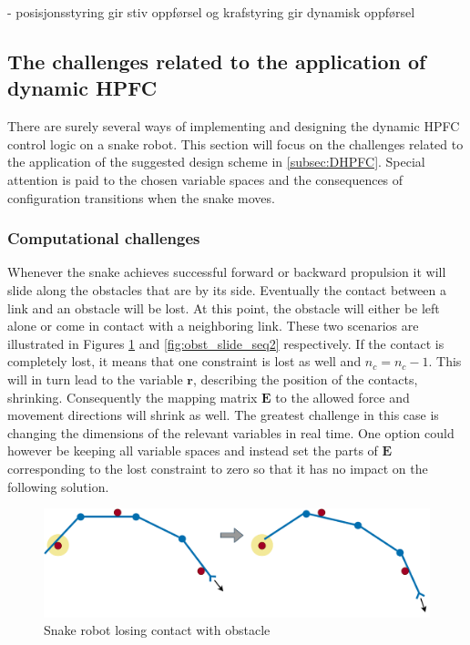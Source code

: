 - posisjonsstyring gir stiv oppførsel og krafstyring gir dynamisk oppførsel


\subsection{The challenges related to the application of dynamic HPFC}

There are surely several ways of implementing and designing the dynamic HPFC control logic on a snake robot. This section will focus on the challenges related to the application of the suggested design scheme in \ref{subsec:DHPFC}. Special attention is paid to the chosen variable spaces and the consequences of configuration transitions when the snake moves.

\subsubsection{Computational challenges}

Whenever the snake achieves successful forward or backward propulsion it will slide along the obstacles that are by its side. Eventually the contact between a link and an obstacle will be lost. At this point, the obstacle will either be left alone or come in contact with a neighboring link. These two scenarios are illustrated in Figures \ref{fig:obst_slide_seq1} and \ref{fig:obst_slide_seq2} respectively. If the contact is completely lost, it means that one constraint is lost as well and $n_c = n_c - 1$. This will in turn lead to the variable $\mathbf{r}$, describing the position of the contacts, shrinking. Consequently the mapping matrix $\mathbf{E}$ to the allowed force and movement directions will shrink as well. The greatest challenge in this case is changing the dimensions of the relevant variables in real time. One option could however be keeping all variable spaces and instead set the parts of $\mathbf{E}$ corresponding to the lost constraint to zero so that it has no impact on the following solution.

\begin{figure}
    \centering
    \includegraphics[width=\textwidth]{figures/theory/obst_slide_sequence1.pdf}
    \caption{Snake robot losing contact with obstacle}
    \label{fig:obst_slide_seq1}
\end{figure}

